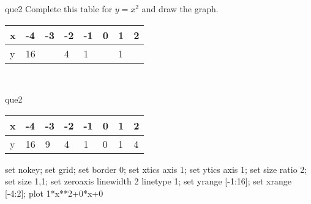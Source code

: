 \documentclass[13.5pt, varwidth=true]{beamer}
\begin{document}
\begin{frame}[shrink=19,fragile]
	\begin{beamercolorbox}[rounded=true, left, shadow=true,wd=14.8cm]{que2}
		 Complete this table for $y = x^{2}$ and draw the graph. \\[0.3cm] \renewcommand{\arraystretch}{1.2}\begin{tabular}{|C|C|C|C|C|C|C|C|} \hline x & -4 & -3 & -2 & -1 & 0 & 1 & 2 \\ \hline y & 16 &  & 4 & 1 &  & 1 & \\ \hline \end{tabular}\\[0.3cm]
	\end{beamercolorbox}
\end{frame}
\begin{frame}[shrink=19,fragile]
	\begin{beamercolorbox}[rounded=true, left, shadow=true,wd=14.8cm]{que2}
		\renewcommand{\arraystretch}{1.2}\begin{tabular}{|C|C|C|C|C|C|C|C|} \hline x & -4 & -3 & -2 & -1 & 0 & 1 & 2 \\ \hline y & 16 & 9 & 4 & 1 & 0 & 1 & 4\\ \hline \end{tabular}\begin{gnuplot}[terminal=pdf] set nokey; set grid; set border 0; set xtics axis 1; set ytics axis 1; set size ratio 2; set size 1,1; set zeroaxis linewidth 2 linetype 1; set yrange [-1:16]; set xrange [-4:2]; plot 1*x**2+0*x+0 \end{gnuplot}
	\end{beamercolorbox}
\end{frame}
\end{document}
